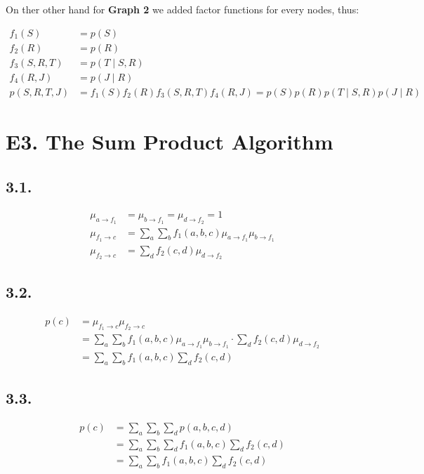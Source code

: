 \documentclass[11pt]{article}
\begin{document}
On ther other hand for \textbf{Graph 2} we added factor functions for every nodes, thus:

\begin{align*}
    f_1(S) &= p(S) \\
    f_2(R) &= p(R) \\
    f_3(S, R, T) &= p(T \mid S, R) \\
    f_4(R, J) &= p(J \mid R) \\
    p(S, R, T, J) &= f_1(S)f_2(R)f_3(S, R, T)f_4(R, J) = p(S)p(R)p(T \mid S, R)p(J \mid R)
\end{align*}


\section*{E3. The Sum Product Algorithm}

\subsection*{3.1.}

\begin{align*}
    \mu_{a \to f_1} &= \mu_{b \to f_1} = \mu_{d \to f_2} = 1 \\
    \mu_{f_1 \to c} &= \sum_a \sum_b f_1(a, b, c) \mu_{a \to f_1} \mu_{b \to f_1} \\
    \mu_{f_2 \to c} &= \sum_d f_2(c, d)\mu_{d \to f_2}
\end{align*}

\subsection*{3.2.}

\begin{align*}
    p(c) &= \mu_{f_1 \to c}\mu_{f_2 \to c} \\
    &=  \sum_a \sum_b f_1(a, b, c) \mu_{a \to f_1} \mu_{b \to f_1} \cdot \sum_d f_2(c, d)\mu_{d \to f_2} \\
    &= \sum_a \sum_b f_1(a, b, c)  \sum_d f_2(c, d)
\end{align*}

\subsection*{3.3.}

\begin{align*}
    p(c) &= \sum_a \sum_b \sum_d p(a, b, c, d) \\
    &= \sum_a \sum_b \sum_d f_1(a, b, c)  \sum_d f_2(c, d) \\
    &= \sum_a \sum_b f_1(a, b, c)  \sum_d f_2(c, d)
\end{align*}
\end{document}

